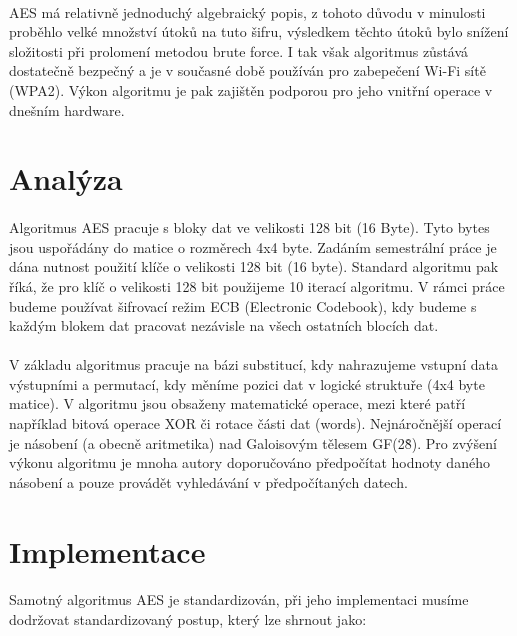\documentclass[12pt, a4paper]{article}
\begin{document}
\paragraph{}
AES má relativně jednoduchý algebraický popis, z tohoto důvodu v minulosti proběhlo velké množství útoků na tuto šifru,
výsledkem těchto útoků bylo snížení složitosti při prolomení metodou brute force. I tak však algoritmus zůstává dostatečně
bezpečný a je v současné době používán pro zabepečení Wi-Fi sítě (WPA2). Výkon algoritmu je pak zajištěn podporou pro
jeho vnitřní operace v dnešním hardware.

\newpage
\section{Analýza}
\paragraph{}
Algoritmus AES pracuje s bloky dat ve velikosti 128 bit (16 Byte). Tyto bytes jsou uspořádány do matice o rozměrech
4x4 byte. Zadáním semestrální práce je dána nutnost použití klíče o velikosti 128 bit (16 byte). Standard algoritmu
pak říká, že pro klíč o velikosti 128 bit použijeme 10 iterací algoritmu. V rámci práce budeme používat šifrovací režim
ECB (Electronic Codebook), kdy budeme s každým blokem dat pracovat nezávisle na všech ostatních blocích dat.
\paragraph{}
V základu algoritmus pracuje na bázi substitucí, kdy nahrazujeme vstupní data výstupními a permutací, kdy měníme pozici
dat v logické struktuře (4x4 byte matice). V algoritmu jsou obsaženy matematické operace, mezi které patří
například bitová operace XOR či rotace části dat (words). Nejnáročnější operací je násobení (a obecně aritmetika) nad
Galoisovým tělesem GF(2\^8). Pro zvýšení výkonu algoritmu je mnoha autory doporučováno předpočítat hodnoty daného násobení
a pouze provádět vyhledávání v předpočítaných datech.

\newpage
\section{Implementace}
\paragraph{}
Samotný algoritmus AES je standardizován, při jeho implementaci musíme dodržovat standardizovaný postup, který lze
shrnout jako:
\end{document}
